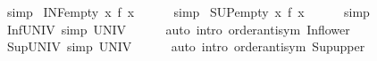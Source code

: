\begin{isabellebody}
\isamarkupfalse%
\ simp%
\endisatagproof
{\isafoldproof}%
%
\isadelimproof
\isanewline
%
\endisadelimproof
\isanewline
{}\isamarkupfalse%
\ INF{\isacharunderscore}{\kern0pt}empty{\isacharcolon}{\kern0pt}\ {\isachardoublequoteopen}{\isacharparenleft}{\kern0pt}{\isasymSqinter}x{\isasymin}{\isacharbraceleft}{\kern0pt}{\isacharbraceright}{\kern0pt}{\isachardot}{\kern0pt}\ f\ x{\isacharparenright}{\kern0pt}\ {\isacharequal}{\kern0pt}\ {\isasymtop}{\isachardoublequoteclose}\isanewline
%
\isadelimproof
\ \ %
\endisadelimproof
%
\isatagproof
{}\isamarkupfalse%
\ simp%
\endisatagproof
{\isafoldproof}%
%
\isadelimproof
\isanewline
%
\endisadelimproof
\isanewline
{}\isamarkupfalse%
\ SUP{\isacharunderscore}{\kern0pt}empty{\isacharcolon}{\kern0pt}\ {\isachardoublequoteopen}{\isacharparenleft}{\kern0pt}{\isasymSqunion}x{\isasymin}{\isacharbraceleft}{\kern0pt}{\isacharbraceright}{\kern0pt}{\isachardot}{\kern0pt}\ f\ x{\isacharparenright}{\kern0pt}\ {\isacharequal}{\kern0pt}\ {\isasymbottom}{\isachardoublequoteclose}\isanewline
%
\isadelimproof
\ \ %
\endisadelimproof
%
\isatagproof
{}\isamarkupfalse%
\ simp%
\endisatagproof
{\isafoldproof}%
%
\isadelimproof
\isanewline
%
\endisadelimproof
\isanewline
{}\isamarkupfalse%
\ Inf{\isacharunderscore}{\kern0pt}UNIV\ {\isacharbrackleft}{\kern0pt}simp{\isacharbrackright}{\kern0pt}{\isacharcolon}{\kern0pt}\ {\isachardoublequoteopen}{\isasymSqinter}UNIV\ {\isacharequal}{\kern0pt}\ {\isasymbottom}{\isachardoublequoteclose}\isanewline
%
\isadelimproof
\ \ %
\endisadelimproof
%
\isatagproof
{}\isamarkupfalse%
\ {\isacharparenleft}{\kern0pt}auto\ intro{\isacharbang}{\kern0pt}{\isacharcolon}{\kern0pt}\ order{\isachardot}{\kern0pt}antisym\ Inf{\isacharunderscore}{\kern0pt}lower{\isacharparenright}{\kern0pt}%
\endisatagproof
{\isafoldproof}%
%
\isadelimproof
\isanewline
%
\endisadelimproof
\isanewline
{}\isamarkupfalse%
\ Sup{\isacharunderscore}{\kern0pt}UNIV\ {\isacharbrackleft}{\kern0pt}simp{\isacharbrackright}{\kern0pt}{\isacharcolon}{\kern0pt}\ {\isachardoublequoteopen}{\isasymSqunion}UNIV\ {\isacharequal}{\kern0pt}\ {\isasymtop}{\isachardoublequoteclose}\isanewline
%
\isadelimproof
\ \ %
\endisadelimproof
%
\isatagproof
{}\isamarkupfalse%
\ {\isacharparenleft}{\kern0pt}auto\ intro{\isacharbang}{\kern0pt}{\isacharcolon}{\kern0pt}\ order{\isachardot}{\kern0pt}antisym\ Sup{\isacharunderscore}{\kern0pt}upper{\isacharparenright}{\kern0pt}%
\endisatagproof
{\isafoldproof}%
%
\isadelimproof
\isanewline
%
\endisadelimproof

\end{isabellebody}
